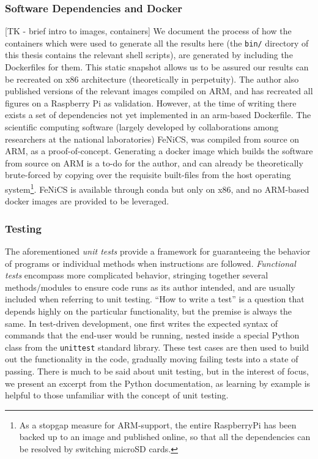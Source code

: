 \subsubsection{Software Dependencies and Docker}\label{sec:docker}
[TK - brief intro to images, containers]
We document the process of how the containers which were used to generate all the results here (the {\tt bin/} directory of this thesis contains the relevant shell scripts), are generated by including the Dockerfiles for them.
This static snapshot allows us to be assured our results can be recreated on x86 architecture (theoretically in perpetuity).
The author also published versions of the relevant images compiled on ARM, and has recreated all figures on a Raspberry Pi as validation.
However, at the time of writing there exists a set of dependencies not yet implemented in an arm-based Dockerfile.
The scientific computing software (largely developed by collaborations among researchers at the national laboratories) FeNiCS, was compiled from source on ARM, as a proof-of-concept.
Generating a docker image which builds the software from source on ARM is a to-do for the author, and can already be theoretically brute-forced by copying over the requisite built-files from the host operating system\footnote{As a stopgap measure for ARM-support, the entire RaspberryPi has been backed up to an image and published online, so that all the dependencies can be resolved by switching microSD cards.}.
FeNiCS is available through conda but only on x86, and no ARM-based docker images are provided to be leveraged.


\subsubsection{Testing}\label{sec:unit-testing}
The aforementioned \emph{unit tests} provide a framework for guaranteeing the behavior of programs or individual methods when instructions are followed.
\emph{Functional tests} encompass more complicated behavior, stringing together several methods/modules to ensure code runs as its author intended, and are usually included when referring to unit testing.
``How to write a test'' is a question that depends highly on the particular functionality, but the premise is always the same.
In test-driven development, one first writes the expected syntax of commands that the end-user would be running, nested inside a special Python class from the {\tt unittest} standard library.
These test cases are then used to build out the functionality in the code, gradually moving failing tests into a state of passing.
There is much to be said about unit testing, but in the interest of focus, we present an excerpt from the Python documentation, as learning by example is helpful to those unfamiliar with the concept of unit testing.

